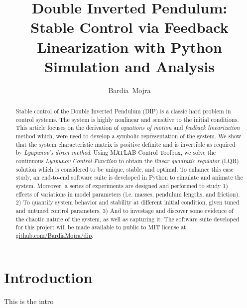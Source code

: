 \documentclass[journal]{IEEEtran}
\begin{document}
%
\title{Double Inverted Pendulum: \\
Stable Control via Feedback Linearization with
Python Simulation and Analysis}
\author{Bardia~Mojra}
\maketitle

\begin{abstract}
Stable control of the Double Inverted Pendulum (DIP) is a classic hard problem in
control systems. The system is highly nonlinear and sensitive to
the initial conditions. This article focuses on the derivation of
\emph{equations of motion} and \emph{feedback linearization} method which,
were used to develop a symbolic representation of the system. We show that the
system characteristic matrix is positive definite and is invertible as required
by \emph{Lyapunov's direct method}. Using MATLAB
Control Toolbox, we solve the continuous \emph{Lyapunov Control Function} to
obtain the \emph{linear quadratic regulator} (LQR) solution which is considered
to be unique, stable, and optimal. To enhance this case study,
an end-to-end software suite is developed in Python to simulate and animate the system. Moreover, a series of experiments are designed and performed to study 1) effects of variations in model
parameters (i.e. masses, pendulum lengths, and friction).
2) To quantify system behavior and stability at different initial condition, given tuned and
untuned control parameters. 3) And to investage and discover some evidence of
the chaotic nature of the system, as well as capturing it. The software suite
developed for this project will be made available to public to MIT license at \href{https://github.com/BardiaMojra/dip}{github.com/BardiaMojra/dip}.

\end{abstract}



\section{Introduction}
This is the intro\\




\end{document}
